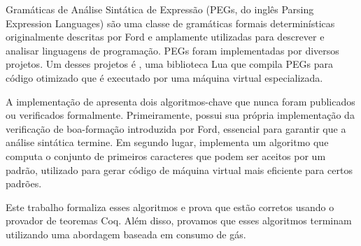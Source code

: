 Gramáticas de Análise Sintática de Expressão
(PEGs, do inglês Parsing Expression Languages) são uma classe de
gramáticas formais determinísticas originalmente descritas por Ford e
amplamente utilizadas para descrever e analisar linguagens de programação.
PEGs foram implementadas por diversos projetos. Um desses projetos é \lpeg{},
uma biblioteca Lua que compila PEGs para código otimizado que é executado
por uma máquina virtual especializada.

A implementação de \lpeg{} apresenta dois algoritmos-chave
que nunca foram publicados ou verificados formalmente.
Primeiramente, \lpeg{} possui sua própria
implementação da verificação de boa-formação introduzida por Ford, essencial
para garantir que a análise sintática termine.
Em segundo lugar, \lpeg{} implementa um algoritmo que computa
o conjunto de primeiros caracteres que
podem ser aceitos por um padrão, utilizado para gerar código de
máquina virtual mais eficiente para certos padrões.

Este trabalho formaliza esses algoritmos
e prova que estão corretos usando o
provador de teoremas Coq.
Além disso, provamos que esses algoritmos
terminam utilizando uma
abordagem baseada em consumo de gás.